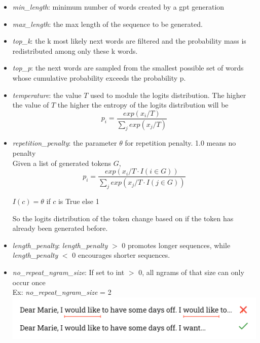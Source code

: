 \begin{itemize}
    \item \textit{min\_length}: minimum number of words created by a gpt generation
    \item \textit{max\_length}: the max length of the sequence to be generated.  
    \item \textit{top\_k}: the k most likely next words are filtered and the probability mass is redistributed among only these k words.
    \item \textit{top\_p}: the next words are sampled from the smallest possible set of words whose cumulative probability exceeds the probability p.
    \item \textit{temperature}: the value $T$ used to module the logits distribution. The higher the value of $T$ the higher the entropy of the logits distribution will be
    \begin{equation*}
        p_i = \frac{exp(x_i/T)}{\sum_j exp(x_j/T)}   
    \end{equation*}
    \item \textit{repetition\_penalty}: the parameter $\theta$ for repetition penalty. 1.0 means no penalty \\
    Given a list of generated tokens $G$, 
     \begin{equation*}
        p_i = \frac{exp(x_i/T \cdot I(i \in G))}{\sum_j exp(x_j/T \cdot I(j \in G))}
    \end{equation*}
    \begin{center}
    $I(c) = \theta$ if $c$ is True else 1
    \end{center}

    So the logits distribution of the token change based on if the token has already been generated before.

    \item \textit{length\_penalty}: \textit{length\_penalty} $>$ 0 promotes longer sequences, while \linebreak 
    \textit{length\_penalty} $<$ 0 encourages shorter sequences.

    \item \textit{no\_repeat\_ngram\_size}: If set to int $>$ 0, all ngrams of that size can only occur once \\
    Ex: \textit{no\_repeat\_ngram\_size} = 2
    \includegraphics[width=\textwidth]{images/no_ngram_thesis.drawio.png}


\end{itemize}
